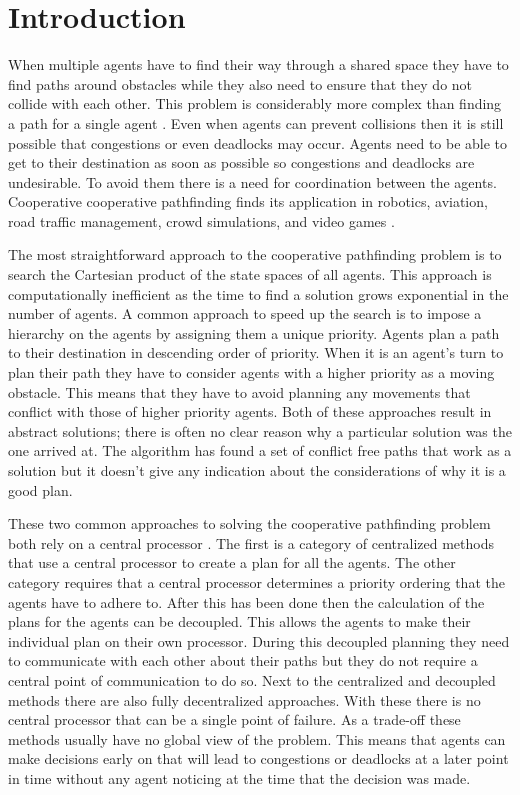 \section{Introduction}\label{sec:intro}
When multiple agents have to find their way through a shared space they have to 
find paths around obstacles while they also need to ensure that they do not 
collide with each other. This problem is considerably more complex than finding 
a path for a single agent \cite{hopcroft1984}. Even when agents can prevent 
collisions then it is still possible that
congestions or even deadlocks may occur. Agents need to be able to get to their
destination as soon as possible so congestions and deadlocks are undesirable. 
To avoid
them there is a need for coordination between the agents. Cooperative
cooperative pathfinding finds its application in robotics, aviation, road
traffic management, crowd simulations, and video games \cite{standley2011}.

The most straightforward approach to the cooperative pathfinding problem
is to search the Cartesian product of the state spaces of all agents. This
approach is computationally inefficient \cite{hopcroft1984,sharon2013} as the 
time to find a
solution grows exponential in the number of agents. A common approach to speed 
up the search is to
impose a hierarchy on the agents by assigning them a unique priority. Agents
plan a path to their destination in descending order of priority. When it is an
agent's turn to plan their path they have to consider agents with a higher
priority as a moving obstacle. This means that they have to avoid planning any
movements that conflict with those of higher priority agents. Both of these
approaches result in abstract solutions; there is often no clear reason why a
particular solution was the one arrived at. The algorithm has found a set of
conflict free paths that work as a solution but it doesn't give
any indication about the considerations of why it is a good plan.

These two common approaches to solving the cooperative pathfinding problem both
rely on a central processor \cite{chouhan2017}. The first is a category of
centralized methods that use a central processor to create a plan for all the
agents. The other category requires that a central processor determines a
priority ordering that the agents have to adhere to. After this has been done
then the calculation of the plans for the agents can be decoupled. This allows
the agents to make their individual plan on their own processor. During this
decoupled planning they need to communicate with each other about their paths
but they do not require a central point of communication to do so. Next to the
centralized and decoupled methods there are also fully decentralized 
approaches. With these there is no central processor
that can be a single point of failure. As a trade-off these methods usually
have no global view of the problem. This means that agents can make decisions
early on that will lead to congestions or deadlocks at a later point in time 
without any agent
noticing at the time that the decision was made.

